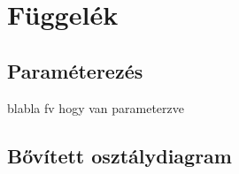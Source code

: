 \appendix
\chapter*{Függelék}
\setcounter{chapter}{6}  %
\setcounter{equation}{0} %
\setcounter{footnote}{0}

\section{Paraméterezés}\label{sect:parameterezes}

blabla fv hogy van parameterzve

\newpage
\section{Bővített osztálydiagram}\label{sect:osztalydiagram}

